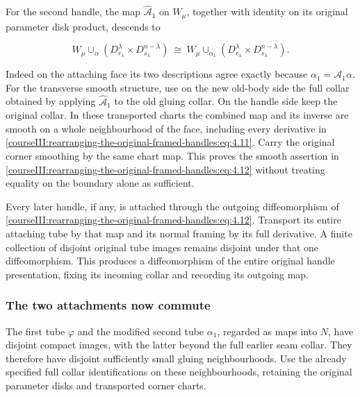 For the second handle, the map \(\widehat{\mathcal A}_1\) on \(W_\mu\), together with identity on its original parameter disk product, descends to

\begin{equation}
W_\mu\cup_\alpha
(D_{r_\lambda}^{\lambda}\times D_{s_\lambda}^{n-\lambda})
\ \cong\
W_\mu\cup_{\alpha_1}
(D_{r_\lambda}^{\lambda}\times D_{s_\lambda}^{n-\lambda}).
\label{courseIII:rearranging-the-original-framed-handles:eq:4.12}
\end{equation}

Indeed on the attaching face its two descriptions agree exactly because \(\alpha_1=\mathcal A_1\alpha\). For the transverse smooth structure, use on the new old-body side the full collar obtained by applying \(\widehat{\mathcal A}_1\) to the old gluing collar. On the handle side keep the original collar. In these transported charts the combined map and its inverse are smooth on a whole neighbourhood of the face, including every derivative in \eqref{courseIII:rearranging-the-original-framed-handles:eq:4.11}. Carry the original corner smoothing by the same chart map. This proves the smooth assertion in \eqref{courseIII:rearranging-the-original-framed-handles:eq:4.12} without treating equality on the boundary alone as sufficient.

Every later handle, if any, is attached through the outgoing diffeomorphism of \eqref{courseIII:rearranging-the-original-framed-handles:eq:4.12}. Transport its entire attaching tube by that map and its normal framing by its full derivative. A finite collection of disjoint original tube images remains disjoint under that one diffeomorphism. This produces a diffeomorphism of the entire original handle presentation, fixing its incoming collar and recording its outgoing map.

\subsubsection{The two attachments now commute}
\label{courseIII:rearranging-the-original-framed-handles:section-4.3}

The first tube \(\varphi\) and the modified second tube \(\alpha_1\), regarded as maps into \(N\), have disjoint compact images, with the latter beyond the full earlier seam collar. They therefore have disjoint sufficiently small gluing neighbourhoods. Use the already specified full collar identifications on these neighbourhoods, retaining the original parameter disks and transported corner charts.

